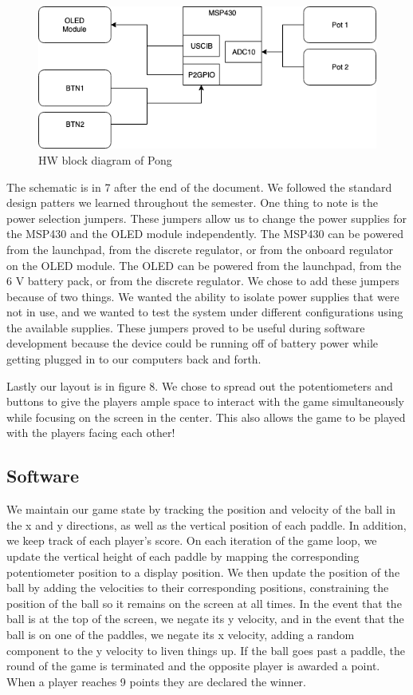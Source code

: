 \documentclass{article}
\begin{document}
\begin{figure}[h!]
    \centering
    \includegraphics[width=\textwidth]{diag.png}
    \caption{HW block diagram of Pong}
    \label{fig:my_label}
\end{figure}

The schematic is in 7 after the end of the document. We followed the standard design patters we learned throughout the semester. One thing to note is the power selection jumpers. These jumpers allow us to change the power supplies for the MSP430 and the OLED module independently. The MSP430 can be powered from the launchpad, from the discrete regulator, or from the onboard regulator on the OLED module. The OLED can be powered from the launchpad, from the 6 V battery pack, or from the discrete regulator. We chose to add these jumpers because of two things. We wanted the ability to isolate power supplies that were not in use, and we wanted to test the system under different configurations using the available supplies.
These jumpers proved to be useful during software development because the device could be running off of battery power while getting plugged in to our computers back and forth. 

Lastly our layout is in figure 8. We chose to spread out the potentiometers and buttons to give the players ample space to interact with the game simultaneously while focusing on the screen in the center. This also allows the game to be played with the players facing each other!

\subsection{Software}
We maintain our game state by tracking the position and velocity of the ball in the x and y directions, as well as the vertical position
of each paddle. In addition, we keep track of each player's score. On each iteration of the game loop, we update the vertical
height of each paddle by mapping the corresponding potentiometer position to a display position. We then update the position of
the ball by adding the velocities
to their corresponding positions, constraining the position of the ball so it remains on the screen at all times. In the
event that the ball is at the top of the screen, we negate its y velocity, and in the event that the ball is on one of the paddles, we negate
its x velocity, adding a random component to the y velocity to liven things up. If the ball goes past a paddle,
the round of the game is terminated and the opposite player is awarded a point. When a player reaches 9 points they are declared the winner.
\end{document}
